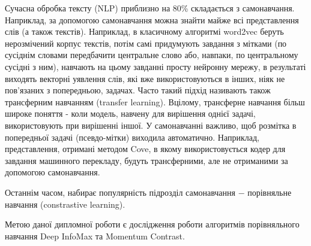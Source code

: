 Сучасна обробка тексту (NLP) приблизно на 80\% складається з самонавчання. Наприклад, за допомогою самонавчання можна знайти майже всі представлення слів (а також текстів). Наприклад, в класичному алгоритмі word2vec беруть нерозмічений корпус текстів, потім самі придумують завдання з мітками (по сусіднім словами передбачити центральне слово або, навпаки, по центральному сусідні з ним), навчають на цьому завданні просту нейронну мережу, в результаті виходять векторні уявлення слів, які вже використовуються в інших, ніяк не пов'язаних з попередньою, задачах. Часто такий підхід називають також трансферним навчанням (transfer learning). Вцілому, трансферне навчання більш широке поняття - коли модель, навчену для вирішення однієї задачі, використовують при вирішенні іншої. У самонавчанні важливо, щоб розмітка в попередньої задачі (псевдо-мітки) виходила автоматично. Наприклад, представлення, отримані методом Cove, в якому використовується кодер для завдання машинного перекладу, будуть трансферними, але не отриманими за допомогою самонавчання.

Останнім часом, набирає популярність підрозділ самонавчання $-$ порівняльне навчання (constrastive learning).

Метою даної дипломної роботи є дослідження роботи алгоритмів порівняльного навчання Deep InfoMax та Momentum Contrast.

